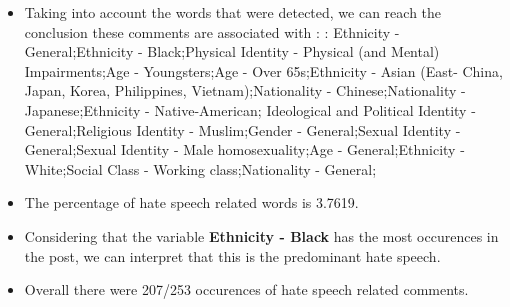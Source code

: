 \documentclass[11pt]{article}
\begin{document}
\begin{itemize}\item Taking into account the words that were detected, we can reach the conclusion these comments are associated with : : Ethnicity - General;Ethnicity - Black;Physical Identity - Physical (and Mental) Impairments;Age - Youngsters;Age - Over 65s;Ethnicity - Asian (East- China, Japan, Korea, Philippines, Vietnam);Nationality - Chinese;Nationality - Japanese;Ethnicity - Native-American; Ideological and Political Identity - General;Religious Identity - Muslim;Gender - General;Sexual Identity - General;Sexual Identity - Male homosexuality;Age - General;Ethnicity - White;Social Class - Working class;Nationality - General;%

\item The percentage of hate speech related words is 3.7619.

\item Considering that the variable \textbf{Ethnicity - Black} has the most occurences in the post, we can interpret that this is the predominant hate speech.

\item Overall there were 207/253 occurences of hate speech related comments.\end{itemize}
\end{document}
